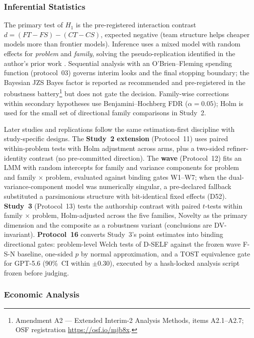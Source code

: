 \documentclass[12pt,a4paper]{article}
\begin{document}
\subsubsection{Inferential Statistics}\label{sec:inferential}

The primary test of $H_1$ is the pre-registered interaction contrast
$d = (FT - FS) - (CT - CS)$, expected negative (team structure helps cheaper
models more than frontier models). Inference uses a mixed model with random
effects for \emph{problem} and \emph{family}, solving the pseudo-replication
identified in the author's
prior work \citep{Hariri2026b}. Sequential analysis with an O'Brien--Fleming
spending function (protocol~03) governs interim looks and the final stopping
boundary; the Bayesian JZS Bayes factor is reported as recommended and
pre-registered in the robustness battery\footnote{Amendment A2 --- Extended
Interim-2 Analysis Methods, items A2.1--A2.7; OSF registration
\url{https://osf.io/mjb8x}.} but
does not gate the decision. Family-wise corrections within secondary hypotheses
use Benjamini--Hochberg FDR ($\alpha = 0.05$); Holm is used for the small set of
directional family comparisons in Study~2.

Later studies and replications follow the same estimation-first discipline with
study-specific designs. The \textbf{Study~2 extension} (Protocol~11) uses paired
within-problem tests with Holm adjustment across arms, plus a two-sided
refiner-identity contrast (no pre-committed direction). The \textbf{wave}
(Protocol~12) fits an LMM with random intercepts for family and variance
components for problem and family $\times$ problem, evaluated against binding
gates W1--W7; when the dual-variance-component model was numerically singular, a
pre-declared fallback substituted a parsimonious structure with bit-identical
fixed effects (D52). \textbf{Study~3} (Protocol~13) tests the authorship
contrast with paired $t$-tests within family $\times$ problem, Holm-adjusted
across the five families, Novelty as the primary dimension and the composite as
a robustness variant (conclusions are DV-invariant). \textbf{Protocol~16}
converts Study~3's point estimates into binding directional gates: problem-level
Welch tests of D-SELF against the frozen wave F-S-N baseline, one-sided $p$ by
normal approximation, and a TOST equivalence gate for GPT-5.6 (90\%~CI within
$\pm 0.30$), executed by a hash-locked analysis script frozen before judging.

\subsubsection{Economic Analysis}
\end{document}
